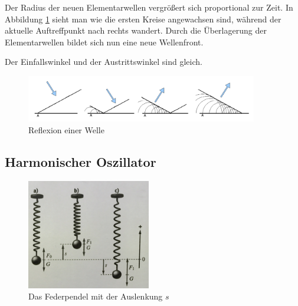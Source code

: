 \documentclass[a4paper]{article}
\begin{document}
					\noindent Der Radius der neuen Elementarwellen vergrößert sich proportional zur Zeit. In Abbildung \ref{img:reflexion} sieht man wie die ersten Kreise angewachsen sind, während der aktuelle Auftreffpunkt nach rechts wandert. Durch die Überlagerung der Elementarwellen bildet sich nun eine neue Wellenfront. 
					
					\noindent Der Einfallswinkel und der Austrittswinkel sind gleich.
					
					\begin{figure}[H]
						\centering
						\includegraphics[width=0.9\textwidth]{img/reflexion.png}
						\caption{Reflexion einer Welle}
						\label{img:reflexion}
					\end{figure}

		\subsection{Harmonischer Oszillator}
			\begin{figure}[H]
				\centering
				\includegraphics[width=0.48\textwidth]{img/Federpendel_001.jpg}
				\caption{Das Federpendel mit der Auslenkung $s$}
				\label{img:federpendel_001}
			\end{figure}
		
\end{document}
